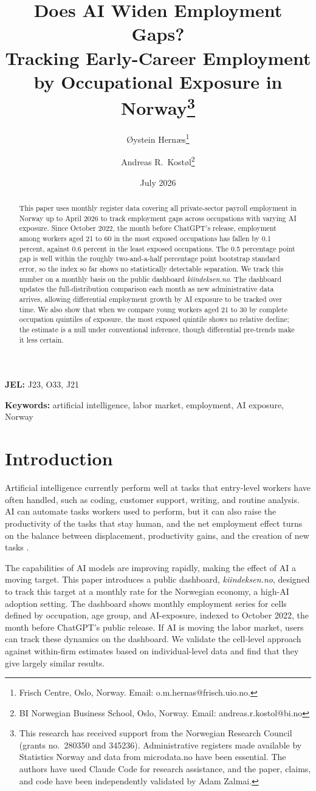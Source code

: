 \documentclass[12pt]{article}
\title{\textbf{Does AI Widen Employment Gaps?\\Tracking Early-Career Employment by Occupational Exposure in Norway}\thanks{This research has received support from the Norwegian Research Council (grants no.\ 280350 and 345236). Administrative registers made available by Statistics Norway and data from microdata.no have been essential. The authors have used Claude Code for research assistance, and the paper, claims, and code have been independently validated by Adam Zalmai.}}
\author{
  {\O}ystein Hern{\ae}s\thanks{Frisch Centre, Oslo, Norway. Email: o.m.hernas@frisch.uio.no.}
  \and
  Andreas R.\ Kost{\o}l\thanks{BI Norwegian Business School, Oslo, Norway. Email: andreas.r.kostol@bi.no}
}
\date{July 2026} %
\begin{document}
\maketitle

\begin{abstract}
\noindent
This paper uses monthly register data covering all private-sector payroll employment in Norway up to April 2026 to track employment gaps across occupations with varying AI exposure. Since October 2022, the month before ChatGPT's release, employment among workers aged 21 to 60 in the most exposed occupations has fallen by 0.1 percent, against 0.6 percent in the least exposed occupations. The 0.5 percentage point gap is well within the roughly two-and-a-half percentage point bootstrap standard error, so the index so far shows no statistically detectable separation. We track this number on a monthly basis on the public dashboard \emph{kiindeksen.no}. The dashboard updates the full-distribution comparison each month as new administrative data arrives, allowing differential employment growth by AI exposure to be tracked over time. We also show that when we compare young workers aged 21 to 30 by complete occupation quintiles of exposure, the most exposed quintile shows no relative decline; the estimate is a null under conventional inference, though differential pre-trends make it less certain.
\end{abstract}

\textbf{JEL:} J23, O33, J21

\textbf{Keywords:} artificial intelligence, labor market, employment, AI exposure, Norway

\clearpage
\setcounter{page}{1}


\section{Introduction}
\label{sec:introduction}

Artificial intelligence currently perform well at tasks that entry-level workers have often handled, such as coding, customer support, writing, and routine analysis. AI can automate tasks workers used to perform, but it can also raise the productivity of the tasks that stay human, and the net employment effect turns on the balance between displacement, productivity gains, and the creation of new tasks \citep{acemoglu2025}. 

The capabilities of AI models are improving rapidly, making the effect of AI a moving target. This paper introduces a public dashboard, \emph{kiindeksen.no}, designed to track this target at a monthly rate for the Norwegian economy, a high-AI adoption setting. The dashboard shows monthly employment series for cells defined by occupation, age group, and AI-exposure, indexed to October 2022, the month before ChatGPT's public release. If AI is moving the labor market, users can track these dynamics on the dashboard. We validate the cell-level approach against within-firm estimates based on individual-level data and find that they give largely similar results. 
\end{document}
